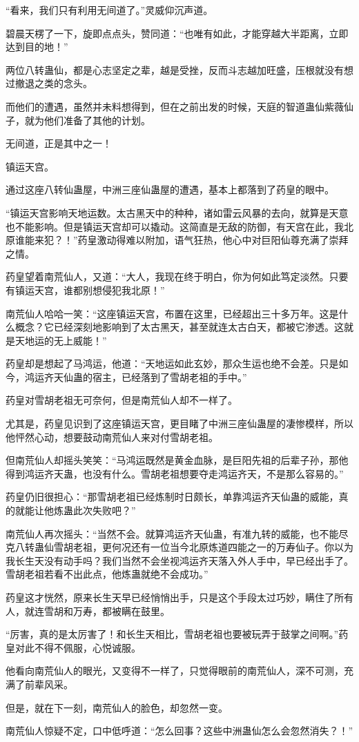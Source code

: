 \begin{this_body}
“看来，我们只有利用无间道了。”灵威仰沉声道。

碧晨天楞了一下，旋即点点头，赞同道：“也唯有如此，才能穿越大半距离，立即达到目的地！”

两位八转蛊仙，都是心志坚定之辈，越是受挫，反而斗志越加旺盛，压根就没有想过撤退之类的念头。

而他们的遭遇，虽然并未料想得到，但在之前出发的时候，天庭的智道蛊仙紫薇仙子，就为他们准备了其他的计划。

无间道，正是其中之一！

镇运天宫。

通过这座八转仙蛊屋，中洲三座仙蛊屋的遭遇，基本上都落到了药皇的眼中。

“镇运天宫影响天地运数。太古黑天中的种种，诸如雷云风暴的去向，就算是天意也不能影响。但是镇运天宫却可以撬动。这简直是无敌的防御，有天宫在此，我北原谁能来犯？！”药皇激动得难以附加，语气狂热，他心中对巨阳仙尊充满了崇拜之情。

药皇望着南荒仙人，又道：“大人，我现在终于明白，你为何如此笃定淡然。只要有镇运天宫，谁都别想侵犯我北原！”

南荒仙人哈哈一笑：“这座镇运天宫，布置在这里，已经超出三十多万年。这是什么概念？它已经深刻地影响到了太古黑天，甚至就连太古白天，都被它渗透。这就是天地运的无上威能！”

药皇却是想起了马鸿运，他道：“天地运如此玄妙，那众生运也绝不会差。只是如今，鸿运齐天仙蛊的宿主，已经落到了雪胡老祖的手中。”

药皇对雪胡老祖无可奈何，但是南荒仙人却不一样了。

尤其是，药皇见识到了这座镇运天宫，更目睹了中洲三座仙蛊屋的凄惨模样，所以他怦然心动，想要鼓动南荒仙人来对付雪胡老祖。

但南荒仙人却摇头笑笑：“马鸿运既然是黄金血脉，是巨阳先祖的后辈子孙，那他得到鸿运齐天蛊，也没有什么。雪胡老祖想要夺走鸿运齐天，不是那么容易的。”

药皇仍旧很担心：“那雪胡老祖已经炼制时日颇长，单靠鸿运齐天仙蛊的威能，真的就能让他炼蛊此次失败吧？”

南荒仙人再次摇头：“当然不会。就算鸿运齐天仙蛊，有准九转的威能，也不能尽克八转蛊仙雪胡老祖，更何况还有一位当今北原炼道四能之一的万寿仙子。你以为我长生天没有动手吗？我们当然不会坐视鸿运齐天落入外人手中，早已经出手了。雪胡老祖若看不出此点，他炼蛊就绝不会成功。”

药皇这才恍然，原来长生天早已经悄悄出手，只是这个手段太过巧妙，瞒住了所有人，就连雪胡和万寿，都被瞒在鼓里。

“厉害，真的是太厉害了！和长生天相比，雪胡老祖也要被玩弄于鼓掌之间啊。”药皇对此不得不佩服，心悦诚服。

他看向南荒仙人的眼光，又变得不一样了，只觉得眼前的南荒仙人，深不可测，充满了前辈风采。

但是，就在下一刻，南荒仙人的脸色，却忽然一变。

南荒仙人惊疑不定，口中低呼道：“怎么回事？这些中洲蛊仙怎么会忽然消失？！”

\end{this_body}

